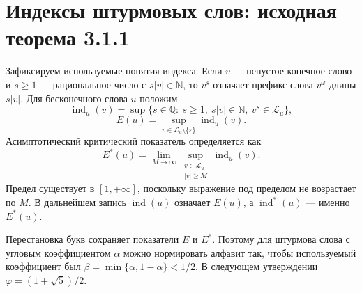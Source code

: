 \documentclass[12pt,a4paper]{article}
\begin{document}
\section{Индексы штурмовых слов: исходная теорема 3.1.1}
Зафиксируем используемые понятия индекса. Если $v$ --- непустое
конечное слово и $s\ge1$ --- рациональное число с $s|v|\in\mathbb N$,
то $v^s$ означает префикс слова $v^\omega$ длины $s|v|$.
Для бесконечного слова $u$ положим
\[
 \operatorname{ind}_u(v)
 =\sup\{s\in\mathbb Q:\ s\ge1,\ s|v|\in\mathbb N,\ v^s\in\mathcal L_u\},
 \]
 \[
 E(u)=\sup_{v\in\mathcal L_u\setminus\{\varepsilon\}}\operatorname{ind}_u(v).
\]
Асимптотический критический показатель определяется как
\[
 E^*(u)=\lim_{M\to\infty}
 \sup_{\substack{v\in\mathcal L_u\\ |v|\ge M}}\operatorname{ind}_u(v).
\]
Предел существует в $[1,+\infty]$, поскольку выражение под
пределом не возрастает по $M$. В дальнейшем запись
$\operatorname{ind}(u)$ означает $E(u)$, а
$\operatorname{ind}^*(u)$ --- именно $E^*(u)$.

Перестановка букв сохраняет показатели $E$ и $E^*$.
Поэтому для штурмова слова с угловым коэффициентом $\alpha$
можно нормировать алфавит так, чтобы используемый коэффициент
был $\beta=\min\{\alpha,1-\alpha\}<1/2$.
В следующем утверждении $\varphi=(1+\sqrt5)/2$.
\end{document}
